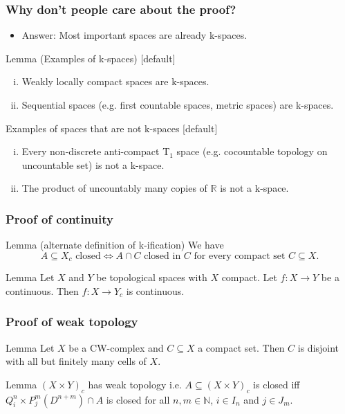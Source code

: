 \documentclass{beamer}
\newcommand{\N}{\mathbb{N}}
\newcommand{\R}{\mathbb{R}}
\begin{document}
\begin{frame}
\frametitle{Why don't people care about the proof?}
  \begin{itemize}
    \item Answer: Most important spaces are already k-spaces.
  \end{itemize}
  \begin{block}{Lemma (Examples of k-spaces)}
    [default]
    \begin{enumerate}[(i)]
      \item Weakly locally compact spaces are k-spaces.
      \item Sequential spaces (e.g. first countable spaces, metric spaces) are k-spaces.
    \end{enumerate}
  \end{block}
  \begin{block}{Examples of spaces that are not k-spaces}
    [default]
    \begin{enumerate}[(i)]
      \item Every non-discrete anti-compact T$_1$ space (e.g. cocountable topology on uncountable set) is not a k-space.
      \item The product of uncountably many copies of $\R$ is not a k-space.
    \end{enumerate}
  \end{block}
\end{frame}

\begin{frame}
\frametitle{Proof of continuity}
  \begin{block}{Lemma (alternate definition of k-ification)}
    We have
    \[A \subseteq X_c \text{ closed} \iff A \cap C \text{ closed in } C \text{ for every compact set } C \subseteq X.\]

  \end{block}
  \begin{block}{Lemma}
    Let $X$ and $Y$ be topological spaces with $X$ compact. 
    Let $f \colon X \to Y$ be a continuous.
    Then $f \colon X \to Y_c$ is continuous.
  \end{block}
\end{frame}

\begin{frame}
\frametitle{Proof of weak topology}
  \begin{block}{Lemma}
    Let $X$ be a CW-complex and $C \subseteq X$ a compact set. 
    Then $C$ is disjoint with all but finitely many cells of $X$.
  \end{block}
  \begin{block}{Lemma}
    $(X \times Y)_c$ has weak topology 
    i.e. $A \subseteq (X \times Y)_c$ is closed iff $Q_i^n \times P_j^m(D^{n + m}) \cap A$ is closed for all $n, m \in \N$, $i \in I_n$ and $j \in J_m$.
  \end{block}
\end{frame}
\end{document}
